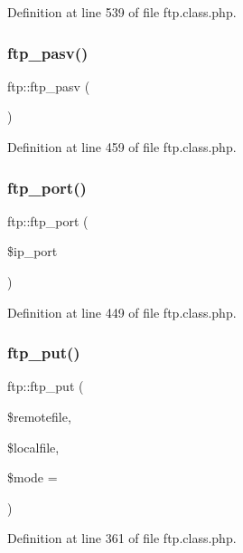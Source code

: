 Definition at line 539 of file ftp.\+class.\+php.

\hypertarget{classftp_a9141940878edcf85afee18e8dcdc6064}{}\label{classftp_a9141940878edcf85afee18e8dcdc6064} 
\subsubsection{\texorpdfstring{ftp\+\_\+pasv()}{ftp\_pasv()}}
{\footnotesize\ttfamily ftp\+::ftp\+\_\+pasv (\begin{DoxyParamCaption}{ }\end{DoxyParamCaption})}



Definition at line 459 of file ftp.\+class.\+php.

\hypertarget{classftp_a94ba304efdf7e1a4a0053d94706a36c9}{}\label{classftp_a94ba304efdf7e1a4a0053d94706a36c9} 
\subsubsection{\texorpdfstring{ftp\+\_\+port()}{ftp\_port()}}
{\footnotesize\ttfamily ftp\+::ftp\+\_\+port (\begin{DoxyParamCaption}\item[{}]{\$ip\+\_\+port }\end{DoxyParamCaption})}



Definition at line 449 of file ftp.\+class.\+php.

\hypertarget{classftp_a509ed4c9d69177fe1b0ad2a02fbc8c27}{}\label{classftp_a509ed4c9d69177fe1b0ad2a02fbc8c27} 
\subsubsection{\texorpdfstring{ftp\+\_\+put()}{ftp\_put()}}
{\footnotesize\ttfamily ftp\+::ftp\+\_\+put (\begin{DoxyParamCaption}\item[{}]{\$remotefile,  }\item[{}]{\$localfile,  }\item[{}]{\$mode = {} }\end{DoxyParamCaption})}



Definition at line 361 of file ftp.\+class.\+php.

